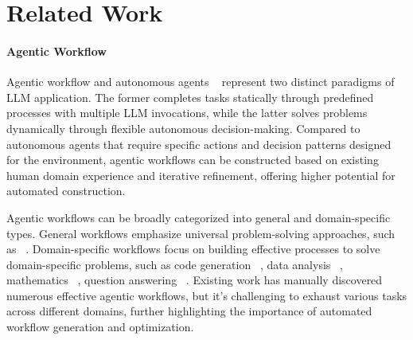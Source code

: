 
\section{Related Work}

\paragraph{Agentic Workflow}
Agentic workflow and autonomous agents ~\citep{zhuge2023mindstorms, hong2024data, jia2024mobile, wang2023voyager} represent two distinct paradigms of LLM application. The former completes tasks statically through predefined processes with multiple LLM invocations, while the latter solves problems dynamically through flexible autonomous decision-making. Compared to autonomous agents that require specific actions and decision patterns designed for the environment, agentic workflows can be constructed based on existing human domain experience and iterative refinement, offering higher potential for automated construction.

Agentic workflows can be broadly categorized into general and domain-specific types. General workflows emphasize universal problem-solving approaches, such as ~\citep{wei2022COT, wang2022COTSC, madaan2023self, wang2023multipersona}. Domain-specific workflows focus on building effective processes to solve domain-specific problems, such as code generation ~\citep{sirui2024meta, Tal2024Alpha, li2024debug}, data analysis ~\citep{yu2024hai, yi2024gen, bo2024nlsql, zhou2023llm}, mathematics ~\citep{zhong2024achieving, xu2024lemur}, question answering ~\citep{nori2023medprompt, zhou2024language}. Existing work has manually discovered numerous effective agentic workflows, but it's challenging to exhaust various tasks across different domains, further highlighting the importance of automated workflow generation and optimization. 



